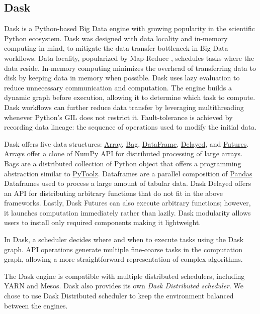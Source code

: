 \documentclass[conference]{IEEEtran}
\begin{document}
\subsection{Dask}
Dask is a Python-based Big Data engine with growing popularity in the scientific Python ecosystem.
Dask was designed with data locality and in-memory computing in mind, to mitigate the data transfer bottleneck in Big Data workflows.
Data locality, popularized by Map-Reduce \cite{dean2008mapreduce}, schedules tasks where the data reside.
In-memory computing minimizes the overhead of transferring data to disk by keeping data in memory when possible.
Dask uses lazy evaluation to reduce unnecessary communication and computation.
The engine builds a dynamic graph before execution, allowing it to determine which task to compute.
Dask workflows can further reduce data transfer by leveraging multithreading whenever Python's GIL does not restrict it.
Fault-tolerance is achieved by recording data lineage: the sequence of operations used to modify the initial data.

Dask offers five data structures:
\href{https://docs.dask.org/en/latest/array.html}{Array},
\href{https://docs.dask.org/en/latest/bag.html}{Bag},
\href{https://docs.dask.org/en/latest/dataframe.html}{DataFrame},
\href{https://docs.dask.org/en/latest/delayed.html}{Delayed},
and \href{https://docs.dask.org/en/latest/futures.html}{Futures}.
Arrays offer a clone of NumPy API for distributed processing of large arrays.
Bags are a distributed collection of Python object that offers a programming abstraction similar to \href{https://toolz.readthedocs.io/en/latest/}{PyToolz}.
Dataframes are a parallel composition of \href{https://pandas.pydata.org/}{Pandas} Dataframes used to process a large amount of tabular data.
Dask Delayed offers an API for distributing arbitrary functions that do not fit in the above frameworks.
Lastly, Dask Futures can also execute arbitrary functions; however, it launches computation immediately rather than lazily.
Dask modularity allows users to install only required components making it lightweight.

In Dask, a scheduler decides where and when to execute tasks using the Dask graph.
API operations generate multiple fine-coarse tasks in the computation graph, allowing a more straightforward representation of complex algorithms.

The Dask engine is compatible with multiple distributed schedulers, including YARN and Mesos.
Dask also provides its own \textit{Dask Distributed scheduler}.
We chose to use Dask Distributed scheduler to keep the environment balanced between the engines.
\end{document}
